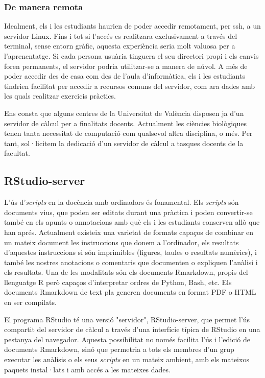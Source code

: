 \documentclass[a4paper,12pt]{article}
\begin{document}
\subsubsection{De manera remota}
Idealment, els i les estudiants haurien de poder accedir remotament, per \textsf{ssh},
a un servidor Linux. Fins i tot si l'accés es realitzara exclusivament a través del
terminal, sense entorn gràfic, aquesta experiència seria molt valuosa per a l'aprenentatge.
Si cada persona usuària tinguera el seu directori propi i els canvis foren permanents,
el servidor podria utilitzar-se a manera de núvol. A més de poder accedir des de casa com
des de l'aula d'informàtica, els i les estudiants tindrien facilitat per accedir a recursos comuns
del servidor, com ara dades amb les quals realitzar exercicis pràctics.

Ens consta que alguns centres de la Universitat de València disposen ja d'un servidor de
càlcul per a finalitats docents. Actualment les ciències biològiques tenen tanta necessitat
de computació com qualsevol altra disciplina, o més. Per tant, sol·licitem la dedicació
d'un servidor de càlcul a tasques docents de la facultat.

\subsection{RStudio-server}
L'ús d'\emph{scripts} en la docència amb ordinadors és fonamental. Els \emph{scripts}
són documents vius, que poden ser editats durant una pràctica i poden convertir-se també
en els apunts o annotacions amb què els i les estudiants conserven allò  que han aprés.
Actualment existeix una varietat de formats capaços de combinar en un mateix document
les instruccions que donem a l'ordinador, els resultats d'aquestes instruccions si són
imprimibles (figures, taules o resultats numèrics), i també les nostres anotacions o
comentaris que documenten o expliquen l'anàlisi i els resultats. Una de les modalitats
són els documents Rmarkdown, propis del llenguatge \textsf{R} però capaços d'interpretar
ordres de Python, Bash, etc. Els documents Rmarkdown de text pla generen documents
en format PDF o HTML en ser compilats.

El programa RStudio té una versió "servidor", RStudio-server, que permet l'ús compartit
del servidor de càlcul a través d'una interfície típica de RStudio en una pestanya del
navegador. Aquesta possibilitat no només facilita l'ús i l'edició de documents Rmarkdown,
sinó que permetria a tots els membres d'un grup executar les anàlisis o els seus \emph{scripts}
en un mateix ambient, amb els mateixos paquets instal·lats i amb accés a les mateixes dades.
\end{document}
